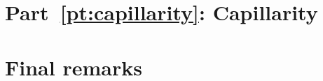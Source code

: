
\section{Part~\ref*{pt:capillarity}: Capillarity}
\label{sec:concluding.capillarity}

\section{Final remarks}
\label{sec:concluding.final}
